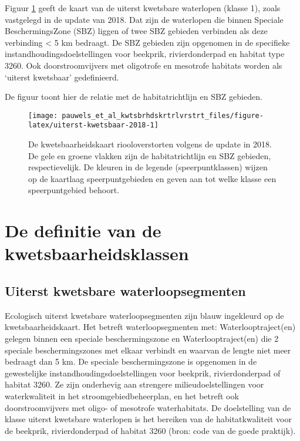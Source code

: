 \documentclass[twoside]{extreport}
\begin{document}
Figuur \ref{fig:uiterst-kwetsbaar-2018} geeft de kaart van de uiterst
kwetsbare waterlopen (klasse 1), zoals vastgelegd in de update van 2018.
Dat zijn de waterlopen die binnen Speciale BeschermingsZone (SBZ) liggen
of twee SBZ gebieden verbinden als deze verbinding \textless{} 5 km
bedraagt. De SBZ gebieden zijn opgenomen in de specifieke
instandhoudingsdoelstellingen voor beekprik, rivierdonderpad en habitat
type 3260. Ook doorstroomvijvers met oligotrofe en mesotrofe habitats
worden als `uiterst kwetsbaar' gedefinieerd.

De figuur toont hier de relatie met de habitatrichtlijn en SBZ gebieden.

\begin{figure}

{\centering \texttt{[image: pauwels\_et\_al\_kwtsbrhdskrtrlvrstrt\_files/figure-latex/uiterst-kwetsbaar-2018-1]} 

}

\caption{De kwetsbaarheidskaart riooloverstorten volgens de update in 2018. De gele en groene vlakken zijn de habitatrichtlijn en SBZ gebieden, respectievelijk. De kleuren in de legende (speerpuntklassen) wijzen op de kaartlaag speerpuntgebieden en geven aan tot welke klasse een speerpuntgebied behoort.}\label{fig:uiterst-kwetsbaar-2018}
\end{figure}

\section{De definitie van de
kwetsbaarheidsklassen}\label{de-definitie-van-de-kwetsbaarheidsklassen}

\subsection{Uiterst kwetsbare
waterloopsegmenten}\label{uiterst-kwetsbare-waterloopsegmenten}

Ecologisch uiterst kwetsbare waterloopsegmenten zijn blauw ingekleurd op
de kwetsbaarheidskaart. Het betreft waterloopsegmenten met:
Waterlooptraject(en) gelegen binnen een speciale beschermingszone en
Waterlooptraject(en) die 2 speciale beschermingszones met elkaar
verbindt en waarvan de lengte niet meer bedraagt dan 5 km. De speciale
beschermingszone is opgenomen in de gewestelijke
instandhoudingsdoelstellingen voor beekprik, rivierdonderpad of habitat
3260. Ze zijn onderhevig aan strengere milieudoelstellingen voor
waterkwaliteit in het stroomgebiedbeheerplan, en het betreft ook
doorstroomvijvers met oligo- of mesotrofe waterhabitats. De doelstelling
van de klasse uiterst kwetsbare waterlopen is het bereiken van de
habitatkwaliteit voor de beekprik, rivierdonderpad of habitat 3260
(bron: code van de goede praktijk).
\end{document}
